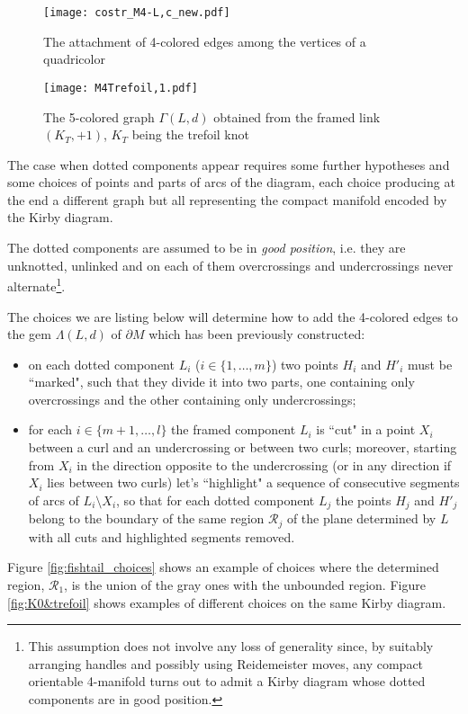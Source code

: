 \documentclass[12pt,a4paper]{article}
\newcommand{\G}{\Gamma}
\begin{document}
\begin{figure} [h!]
    \centering
        \texttt{[image: costr\_M4-L,c\_new.pdf]}
\caption{The attachment of 4-colored edges among the vertices of a quadricolor}
    \label{fig:quadricolor}
\end{figure}

\begin{figure} [h!]
    \centering
        \texttt{[image: M4Trefoil,1.pdf]}    
\caption{The 5-colored graph $\G(L,d)$ obtained from the framed link $({K_T},+1)$, $K_T$ being the trefoil knot}  
    \label{fig:M4_trefoil1}
\end{figure}


The case when dotted components appear requires some further hypotheses and some choices of points and parts of arcs of the diagram, each choice producing at the end a different graph but all representing the compact manifold encoded by the Kirby diagram.

The dotted components are assumed to be in {\it good position}, i.e. they are unknotted, unlinked and on each of them overcrossings and undercrossings never alternate\footnote{This assumption does not involve any loss of generality since, by suitably arranging handles and possibly using Reidemeister moves, any compact orientable 4-manifold turns out to admit a Kirby diagram whose dotted components are in good position.}.

The choices we are listing below will determine how to add the 4-colored edges to the gem $\Lambda(L,d)$  of $\partial M$ which has been previously constructed:
\begin{itemize}
\item on each dotted component $L_i$ ($i\in\{1,\ldots,m\}$) two points $H_i$ and $H'_i$ must be ``marked", such that they divide it into two parts, one containing only overcrossings and the other containing only undercrossings;
\item for each $i\in\{m+1,\ldots,l\}$ the framed component $L_i$ is ``cut" in a point $X_i$ between a curl and an undercrossing or between two curls; moreover, starting from $X_i$ in the direction opposite to the undercrossing (or in any direction if $X_i$ lies between two curls) let’s ``highlight" a sequence of consecutive segments of arcs of $L_i\setminus X_i$, so that for each dotted component $L_j$ the points $H_j$ and $H'_j$ belong to the boundary of the same region $\mathcal R_j$ of the plane determined by $L$ with all cuts and highlighted segments removed. 
\end{itemize}
Figure \ref{fig:fishtail_choices} shows an example of choices where the determined region, $\mathcal R_1$, is the union of the gray ones with the unbounded region. Figure \ref{fig:K0&trefoil} shows examples of different choices on the same Kirby diagram.
\end{document}
